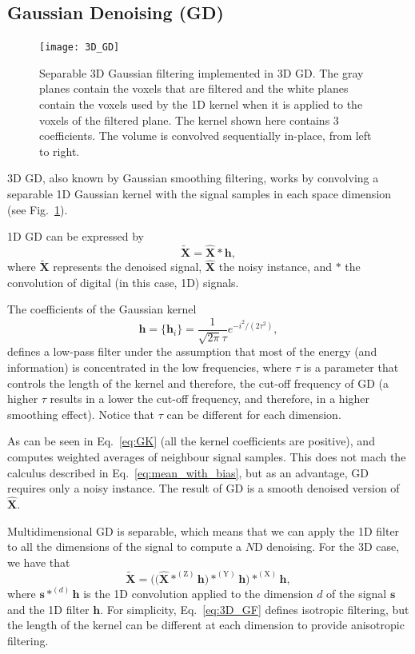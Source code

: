 \documentclass{article}
\begin{document}
\subsection{Gaussian Denoising (GD)}

\begin{figure}
  \centering
  \texttt{[image: 3D\_GD]}
  \caption{Separable 3D Gaussian filtering implemented in 3D GD. The
    gray planes contain the voxels that are filtered and the white
    planes contain the voxels used by the 1D kernel when it is applied
    to the voxels of the filtered plane. The kernel shown here
    contains 3 coefficients. The volume is convolved sequentially
    in-place, from left to right.\label{fig:3D_GD}}
\end{figure}

3D GD, also known by Gaussian smoothing filtering, works by convolving a
separable 1D Gaussian kernel with the signal samples in each space
dimension (see Fig.~\ref{fig:3D_GD}).

1D GD can be expressed by
\begin{equation}
  \tilde{\mathbf{X}} = \hat{\mathbf{X}}*\mathbf{h},
  \label{eq:GF}
\end{equation}
where $\tilde{\mathbf{X}}$ represents the denoised signal,
$\hat{\mathbf{X}}$ the noisy instance, and $*$ the convolution of
digital (in this case, 1D) signals.

The coefficients of the Gaussian kernel
\begin{equation}
  \mathbf{h} = \{\mathbf{h}_i\} = \frac{1}{\sqrt{2\pi}\tau}e^{{-i}^2/(2\tau^2)},
  \label{eq:GK}
\end{equation}
defines a low-pass filter under the assumption that most of the energy
(and information) is concentrated in the low frequencies, where
$\tau$ is a parameter that controls the length of the kernel and
therefore, the cut-off frequency of GD (a higher $\tau$ results in a
lower the cut-off frequency, and therefore, in a higher smoothing
effect). Notice that $\tau$ can be different for each dimension.

As can be seen in Eq.~\ref{eq:GK} (all the kernel coefficients are
positive), and computes weighted averages of neighbour signal
samples. This does not mach the calculus described in
Eq.~\ref{eq:mean_with_bias}, but as an advantage, GD requires only a
noisy instance. The result of GD is a smooth denoised version of
$\hat{\mathbf X}$.

Multidimensional GD is separable, which means that we can apply the 1D
filter to all the dimensions of the signal to compute a $N$D
denoising. For the 3D case, we have that
\begin{equation}
  \tilde{\mathbf{X}} = \Big(\big(\hat{\mathbf X}*^{(\text{Z})}{\mathbf h}\big)*^{(\text{Y})}{\mathbf h}\Big)*^{(\text{X})}{\mathbf h},
    \label{eq:3D_GF}
\end{equation}
where ${\mathbf s}*^{(d)}{\mathbf h}$ is the 1D convolution applied to
the dimension $d$ of the signal ${\mathbf s}$ and the 1D filter
${\mathbf h}$. For simplicity, Eq.~\ref{eq:3D_GF} defines isotropic
filtering, but the length of the kernel can be different at each
dimension to provide anisotropic filtering.
\end{document}
